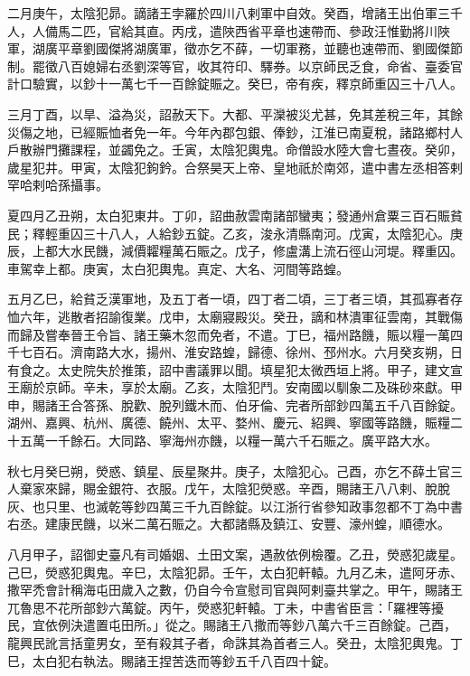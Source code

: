\begin{pinyinscope}
 二月庚午，太陰犯昴。謫諸王孛羅於四川八剌軍中自效。癸酉，增諸王出伯軍三千人，人備馬二匹，官給其直。丙戌，遣陜西省平章也速帶而、參政汪惟勤將川陜軍，湖廣平章劉國傑將湖廣軍，徵亦乞不薛，一切軍務，並聽也速帶而、劉國傑節制。罷徵八百媳婦右丞劉深等官，收其符印、驛券。以京師民乏食，命省、臺委官計口驗實，以鈔十一萬七千一百餘錠賑之。癸巳，帝有疾，釋京師重囚三十八人。



 三月丁酉，以旱、溢為災，詔赦天下。大都、平灤被災尤甚，免其差稅三年，其餘災傷之地，已經賑恤者免一年。今年內郡包銀、俸鈔，江淮已南夏稅，諸路鄉村人戶散辦門攤課程，並蠲免之。壬寅，太陰犯輿鬼。命僧設水陸大會七晝夜。癸卯，歲星犯井。甲寅，太陰犯鉤鈐。合祭昊天上帝、皇地祇於南郊，遣中書左丞相答剌罕哈剌哈孫攝事。



 夏四月乙丑朔，太白犯東井。丁卯，詔曲赦雲南諸部蠻夷；發通州倉粟三百石賑貧民；釋輕重囚三十八人，人給鈔五錠。乙亥，浚永清縣南河。戊寅，太陰犯心。庚辰，上都大水民饑，減價糶糧萬石賑之。戊子，修盧溝上流石徑山河堤。釋重囚。車駕幸上都。庚寅，太白犯輿鬼。真定、大名、河間等路蝗。



 五月乙巳，給貧乏漢軍地，及五丁者一頃，四丁者二頃，三丁者三頃，其孤寡者存恤六年，逃散者招諭復業。戊申，太廟寢殿災。癸丑，謫和林潰軍征雲南，其戰傷而歸及嘗奉晉王令旨、諸王藥木忽而免者，不遣。丁巳，福州路饑，賑以糧一萬四千七百石。濟南路大水，揚州、淮安路蝗，歸德、徐州、邳州水。六月癸亥朔，日有食之。太史院失於推策，詔中書議罪以聞。填星犯太微西垣上將。甲子，建文宣王廟於京師。辛未，享於太廟。乙亥，太陰犯鬥。安南國以馴象二及硃砂來獻。甲申，賜諸王合答孫、脫歡、脫列鐵木而、伯牙倫、完者所部鈔四萬五千八百餘錠。湖州、嘉興、杭州、廣德、饒州、太平、婺州、慶元、紹興、寧國等路饑，賑糧二十五萬一千餘石。大同路、寧海州亦饑，以糧一萬六千石賑之。廣平路大水。



 秋七月癸巳朔，熒惑、鎮星、辰星聚井。庚子，太陰犯心。己酉，亦乞不薛土官三人棄家來歸，賜金銀符、衣服。戊午，太陰犯熒惑。辛酉，賜諸王八八剌、脫脫灰、也只里、也滅乾等鈔四萬三千九百餘錠。以江浙行省參知政事忽都不丁為中書右丞。建康民饑，以米二萬石賑之。大都諸縣及鎮江、安豐、濠州蝗，順德水。



 八月甲子，詔御史臺凡有司婚姻、土田文案，遇赦依例檢覆。乙丑，熒惑犯歲星。己巳，熒惑犯輿鬼。辛巳，太陰犯昴。壬午，太白犯軒轅。九月乙未，遣阿牙赤、撒罕禿會計稱海屯田歲入之數，仍自今令宣慰司官與阿剌臺共掌之。甲午，賜諸王兀魯思不花所部鈔六萬錠。丙午，熒惑犯軒轅。丁未，中書省臣言：「羅裡等擾民，宜依例決遣置屯田所。」從之。賜諸王八撒而等鈔八萬六千三百餘錠。己酉，龍興民訛言括童男女，至有殺其子者，命誅其為首者三人。癸丑，太陰犯輿鬼。丁巳，太白犯右執法。賜諸王捏苦迭而等鈔五千八百四十錠。




\end{pinyinscope}
